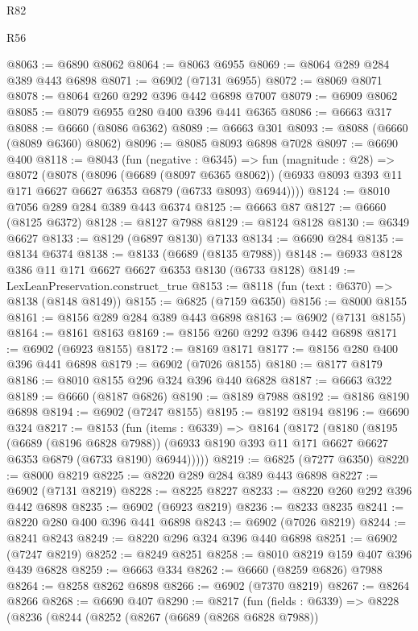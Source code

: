 \begin{lexlean}{R82}
\begin{lexlean}{R56}
\begin{coremodule}
{{{{{{{{{{{{{{{{{{{{{{{{{{{{{{{{{{{{{{{{{{{{{{{{{{{{{{{{{{{{{{{{{{{{{{{{{{{{{{{{{{{{{{{{{{{{{{{{{{{{{{{{{{{{{{{{{{{{{{{{{{{{{{{{{{{{{{{{{{{{{{{{{{{{{{{{{{{{{{{{{{{{{{{{{{{{{{{{{{{{{{{{{{{{{{{{{{{{{{{{{{{{{{{{{{{@8063 := @6890 @8062
@8064 := @8063 @6955
@8069 := @8064 @289 @284 @389 @443 @6898
@8071 := @6902 (@7131 @6955)
@8072 := @8069 @8071
@8078 := @8064 @260 @292 @396 @442 @6898 @7007
@8079 := @6909 @8062
@8085 := @8079 @6955 @280 @400 @396 @441 @6365
@8086 := @6663 @317
@8088 := @6660 (@8086 @6362)
@8089 := @6663 @301
@8093 := @8088 (@6660 (@8089 @6360) @8062)
@8096 := @8085 @8093 @6898 @7028
@8097 := @6690 @400
@8118 := @8043
    (fun (negative : @6345) =>
    fun (magnitude : @28) =>
    @8072
      (@8078
        (@8096
          (@6689 (@8097 @6365 @8062))
          (@6933 @8093 @393 @11 @171 @6627 @6627 @6353 @6879 (@6733 @8093) @6944))))
@8124 := @8010 @7056 @289 @284 @389 @443 @6374
@8125 := @6663 @87
@8127 := @6660 (@8125 @6372)
@8128 := @8127 @7988
@8129 := @8124 @8128
@8130 := @6349 @6627
@8133 := @8129 (@6897 @8130) @7133
@8134 := @6690 @284
@8135 := @8134 @6374
@8138 := @8133 (@6689 (@8135 @7988))
@8148 := @6933 @8128 @386 @11 @171 @6627 @6627 @6353 @8130 (@6733 @8128)
@8149 := LexLeanPreservation.construct_true
@8153 := @8118 (fun (text : @6370) => @8138 (@8148 @8149))
@8155 := @6825 (@7159 @6350)
@8156 := @8000 @8155
@8161 := @8156 @289 @284 @389 @443 @6898
@8163 := @6902 (@7131 @8155)
@8164 := @8161 @8163
@8169 := @8156 @260 @292 @396 @442 @6898
@8171 := @6902 (@6923 @8155)
@8172 := @8169 @8171
@8177 := @8156 @280 @400 @396 @441 @6898
@8179 := @6902 (@7026 @8155)
@8180 := @8177 @8179
@8186 := @8010 @8155 @296 @324 @396 @440 @6828
@8187 := @6663 @322
@8189 := @6660 (@8187 @6826)
@8190 := @8189 @7988
@8192 := @8186 @8190 @6898
@8194 := @6902 (@7247 @8155)
@8195 := @8192 @8194
@8196 := @6690 @324
@8217 := @8153
    (fun (items : @6339) =>
    @8164
      (@8172
        (@8180
          (@8195
            (@6689 (@8196 @6828 @7988))
            (@6933 @8190 @393 @11 @171 @6627 @6627 @6353 @6879 (@6733 @8190) @6944)))))
@8219 := @6825 (@7277 @6350)
@8220 := @8000 @8219
@8225 := @8220 @289 @284 @389 @443 @6898
@8227 := @6902 (@7131 @8219)
@8228 := @8225 @8227
@8233 := @8220 @260 @292 @396 @442 @6898
@8235 := @6902 (@6923 @8219)
@8236 := @8233 @8235
@8241 := @8220 @280 @400 @396 @441 @6898
@8243 := @6902 (@7026 @8219)
@8244 := @8241 @8243
@8249 := @8220 @296 @324 @396 @440 @6898
@8251 := @6902 (@7247 @8219)
@8252 := @8249 @8251
@8258 := @8010 @8219 @159 @407 @396 @439 @6828
@8259 := @6663 @334
@8262 := @6660 (@8259 @6826) @7988
@8264 := @8258 @8262 @6898
@8266 := @6902 (@7370 @8219)
@8267 := @8264 @8266
@8268 := @6690 @407
@8290 := @8217
    (fun (fields : @6339) =>
    @8228
      (@8236
        (@8244
          (@8252
            (@8267
              (@6689 (@8268 @6828 @7988))
}}}}}}}}}}}}}}}}}}}}}}}}}}}}}}}}}}}}}}}}}}}}}}}}}}}}}}}}}}}}}}}}}}}}}}}}}}}}}}}}}}}}}}}}}}}}}}}}}}}}}}}}}}}}}}}}}}}}}}}}}}}}}}}}}}}}}}}}}}}}}}}}}}}}}}}}}}}}}}}}}}}}}}}}}}}}}}}}}}}}}}}}}}}}}}}}}}}}}}}}}}}}}}}}}}}
\end{coremodule}
\end{lexlean}
\end{lexlean}
